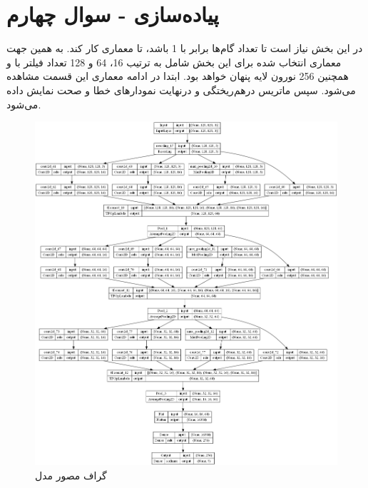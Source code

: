\documentclass{article}
\begin{document}
\cleardoublepage

\section{پیاده‌سازی - سوال چهارم}
در این بخش نیاز است تا تعداد گام‌ها برابر با 1 باشد، تا معماری کار کند. به همین جهت معماری انتخاب شده برای این بخش شامل به ترتیب 16، 64 و 128 تعداد فیلتر با  و همچنین 256 نورون لایه پنهان خواهد بود. ابتدا در ادامه معماری این قسمت مشاهده می‌شود. سپس ماتریس درهم‌ریختگی و درنهایت نمودارهای خطا و صحت نمایش داده می‌شود.

\begin{figure}[!h]
    \centering\includegraphics[scale=.25]{./p4-1}
    \caption{گراف مصور مدل}\label{fig.41}
\end{figure}
\end{document}
